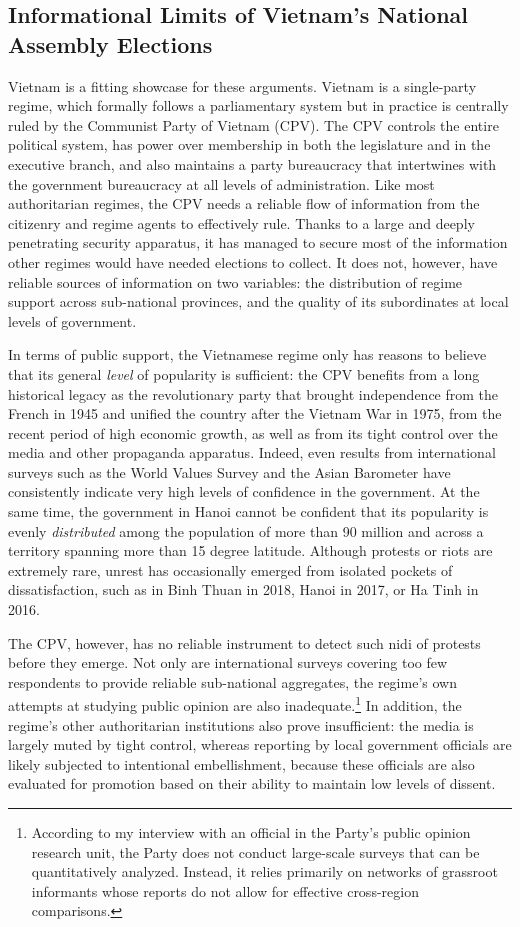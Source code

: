\documentclass[12pt]{article}
\newcommand{\1}{\mathbbm{1}}
\begin{document}
\subsection{Informational Limits of Vietnam's National Assembly Elections}
\label{sec:vietnam_limits}
Vietnam is a fitting showcase for these arguments. Vietnam is a single-party regime, which formally follows a parliamentary system but in practice is centrally ruled by the Communist Party of Vietnam (CPV). The CPV controls the entire political system, has power over membership in both the legislature and in the executive branch, and also maintains a party bureaucracy that intertwines with the government bureaucracy at all levels of administration. Like most authoritarian regimes, the CPV needs a reliable flow of information from the citizenry and regime agents to effectively rule. Thanks to a large and deeply penetrating security apparatus, it has managed to secure most of the information other regimes would have needed elections to collect. It does not, however, have reliable sources of information on two variables: the distribution of regime support across sub-national provinces, and the quality of its subordinates at local levels of government. 

In terms of public support, the Vietnamese regime only has reasons to believe that its general \textit{level} of popularity is sufficient: the CPV benefits from a long historical legacy as the revolutionary party that brought independence from the French in 1945 and unified the country after the Vietnam War in 1975, from the recent period of high economic growth, as well as from its tight control over the media and other propaganda apparatus. Indeed, even results from international surveys such as the World Values Survey \citeyearpar{wvs} and the Asian Barometer \citeyearpar{abs} have consistently indicate very high levels of confidence in the government. At the same time, the government in Hanoi cannot be confident that its popularity is evenly \textit{distributed} among the population of more than 90 million and across a territory spanning more than 15 degree latitude. Although protests or riots are extremely rare, unrest has occasionally emerged from isolated pockets of dissatisfaction, such as in Binh Thuan in 2018, Hanoi in 2017, or Ha Tinh in 2016. 

The CPV, however, has no reliable instrument to detect such nidi of protests before they emerge. Not only are international surveys covering too few respondents to provide reliable sub-national aggregates, the regime's own attempts at studying public opinion are also inadequate.\footnote{According to my interview with an official in the Party's public opinion research unit, the Party does not conduct large-scale surveys that can be quantitatively analyzed. Instead, it relies primarily on networks of grassroot informants whose reports do not allow for effective cross-region comparisons.} In addition, the regime's other authoritarian institutions also prove insufficient: the media is largely muted by tight control, whereas reporting by local government officials are likely subjected to intentional embellishment, because these officials are also evaluated for promotion based on their ability to maintain low levels of dissent.
\end{document}
